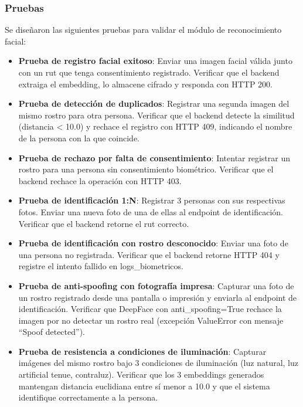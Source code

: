 \subsubsection{Pruebas}

Se diseñaron las siguientes pruebas para validar el módulo de reconocimiento facial:

\begin{itemize}
    \item \textbf{Prueba de registro facial exitoso}: Enviar una imagen facial válida junto con un rut que tenga consentimiento registrado. Verificar que el backend extraiga el embedding, lo almacene cifrado y responda con HTTP 200.

    \item \textbf{Prueba de detección de duplicados}: Registrar una segunda imagen del mismo rostro para otra persona. Verificar que el backend detecte la similitud (distancia < 10.0) y rechace el registro con HTTP 409, indicando el nombre de la persona con la que coincide.

    \item \textbf{Prueba de rechazo por falta de consentimiento}: Intentar registrar un rostro para una persona sin consentimiento biométrico. Verificar que el backend rechace la operación con HTTP 403.

    \item \textbf{Prueba de identificación 1:N}: Registrar 3 personas con sus respectivas fotos. Enviar una nueva foto de una de ellas al endpoint de identificación. Verificar que el backend retorne el rut correcto.

    \item \textbf{Prueba de identificación con rostro desconocido}: Enviar una foto de una persona no registrada. Verificar que el backend retorne HTTP 404 y registre el intento fallido en logs\_biometricos.

    \item \textbf{Prueba de anti-spoofing con fotografía impresa}: Capturar una foto de un rostro registrado desde una pantalla o impresión y enviarla al endpoint de identificación. Verificar que DeepFace con anti\_spoofing=True rechace la imagen por no detectar un rostro real (excepción ValueError con mensaje ``Spoof detected'').

    \item \textbf{Prueba de resistencia a condiciones de iluminación}: Capturar imágenes del mismo rostro bajo 3 condiciones de iluminación (luz natural, luz artificial tenue, contraluz). Verificar que los 3 embeddings generados mantengan distancia euclidiana entre sí menor a 10.0 y que el sistema identifique correctamente a la persona.


\end{itemize}
